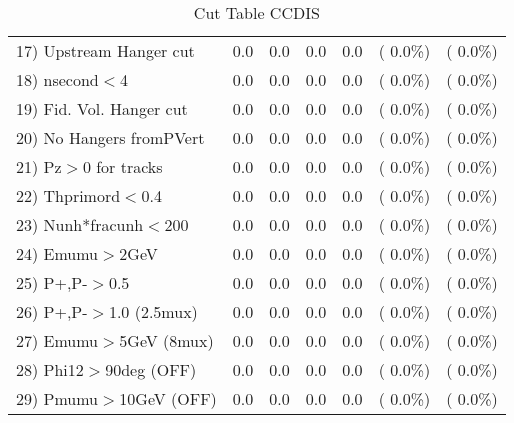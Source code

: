 \begin{table}[h!]
\begin{tabular}{||l||r|r|r|r|r|r||}
 17) Upstream Hanger cut  &          0.0 &          0.0 &          0.0 &          0.0 & (  0.0\%) & (  0.0\%) \\
 18) nsecond$<$4          &          0.0 &          0.0 &          0.0 &          0.0 & (  0.0\%) & (  0.0\%) \\
 19) Fid. Vol. Hanger cut &          0.0 &          0.0 &          0.0 &          0.0 & (  0.0\%) & (  0.0\%) \\
 20) No Hangers fromPVert &          0.0 &          0.0 &          0.0 &          0.0 & (  0.0\%) & (  0.0\%) \\
 21) Pz$>$0 for tracks    &          0.0 &          0.0 &          0.0 &          0.0 & (  0.0\%) & (  0.0\%) \\
 22) Thprimord$<$0.4      &          0.0 &          0.0 &          0.0 &          0.0 & (  0.0\%) & (  0.0\%) \\
 23) Nunh*fracunh$<$200   &          0.0 &          0.0 &          0.0 &          0.0 & (  0.0\%) & (  0.0\%) \\
 24) Emumu$>$2GeV         &          0.0 &          0.0 &          0.0 &          0.0 & (  0.0\%) & (  0.0\%) \\
 25) P+,P-$>$0.5          &          0.0 &          0.0 &          0.0 &          0.0 & (  0.0\%) & (  0.0\%) \\
 26) P+,P-$>$1.0 (2.5mux) &          0.0 &          0.0 &          0.0 &          0.0 & (  0.0\%) & (  0.0\%) \\
 27) Emumu$>$5GeV  (8mux) &          0.0 &          0.0 &          0.0 &          0.0 & (  0.0\%) & (  0.0\%) \\
 28) Phi12$>$90deg  (OFF) &          0.0 &          0.0 &          0.0 &          0.0 & (  0.0\%) & (  0.0\%) \\
 29) Pmumu$>$10GeV  (OFF) &          0.0 &          0.0 &          0.0 &          0.0 & (  0.0\%) & (  0.0\%) \\
 \hline
 \hline
 \end{tabular}
 \caption{Cut Table  CCDIS    }
 \label{tab-cutcohjpsi-mumu_ccdis}
 \end{table}
